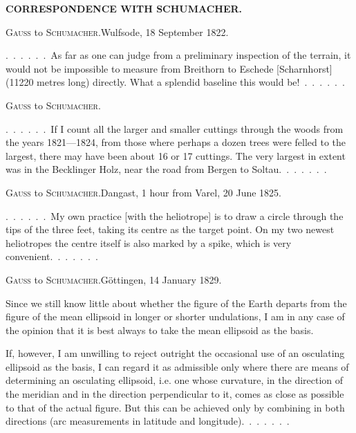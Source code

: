 \clearpage
{}\hfill\textbf{CORRESPONDENCE WITH SCHUMACHER.}
\begin{center}\textsc{Gauss} to \textsc{Schumacher}.\quad Wulfsode, 18 September 1822.\end{center}

.\ .\ .\ .\ .\ .\ As far as one can judge from a preliminary inspection of the terrain,
it would not be impossible to measure  from Breithorn to Eschede
[Scharnhorst] (11220 metres long) directly. What a splendid
baseline this would be!\ .\ .\ .\ .\ .\ .

\begin{center}\textsc{Gauss} to \textsc{Schumacher}.\end{center}

.\ .\ .\ .\ .\ .\ If I count all the larger and smaller cuttings through the woods from the years
1821---1824, from those where perhaps a dozen trees
were felled to the largest, there may have been about 16 or 17 cuttings.
The very largest in extent was in the Becklinger
Holz, near the road from Bergen to Soltau.\ .\ .\ .\ .\ .\ .

\begin{center}\textsc{Gauss} to \textsc{Schumacher}.\quad Dangast, 1 hour from Varel, 20 June 1825.\end{center}

.\ .\ .\ .\ .\ .\ My own practice [with the heliotrope] is to draw a circle through the tips
of the three feet, taking its centre as the target point.
On my two newest heliotropes the centre itself is also marked by a
spike, which is very convenient.\ .\ .\ .\ .\ .\ .

\begin{center}\textsc{Gauss} to \textsc{Schumacher}.\quad Göttingen, 14 January 1829.\end{center}

Since we still know little about whether the figure of the Earth departs from the figure
of the mean ellipsoid in longer or shorter undulations,
I am in any case of the opinion that it is best always to take the mean
ellipsoid as the basis.

If, however, I am unwilling to reject outright the occasional use of an
osculating ellipsoid as the basis, I can regard it as admissible only
where there are means of determining an osculating ellipsoid,
i.e. one whose curvature,  in the direction of the meridian
and in the direction perpendicular to it, comes as close as possible to
that of the actual figure. But this can be achieved only by combining 
in both directions (arc measurements in latitude and longitude).\ .\ .\ .\ .\ .\ .

